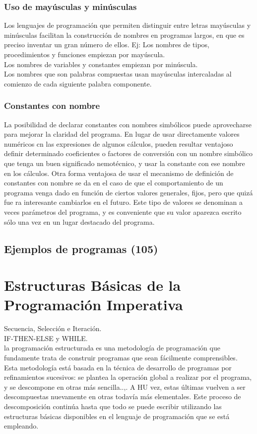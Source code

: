\documentclass[11pt,a4paper]{article}
\begin{document}
  \subsubsection{Uso de mayúsculas y minúsculas}
 Los lenguajes de programación que permiten distinguir entre letras mayúsculas 
 y minúsculas facilitan la construcción de nombres en programas largos, en que 
 es preciso inventar un gran número de ellos.
 Ej:
  Los nombres de tipos, procedimientos y funciones empiezan por mayúscula.\\
  Los nombres de variables y constantes empiezan por minúscula.\\
  Los nombres que son palabras compuestas usan mayúsculas intercaladas 
  al comienzo de cada siguiente palabra componente.\\
  \subsubsection{Constantes con nombre}
  La posibilidad de declarar constantes con nombres simbólicos puede aprovecharse para mejorar la claridad del programa. En lugar de usar directamente 
  valores numéricos cn las expresiones de algunos cálculos, pueden resultar ventajoso definir determinado coeficientes o factores de conversión con un nombre 
  simbólico que tenga un buen significado nemotécnico, y usar la constante con 
  ese nombre en los cálculos. Otra forma ventajosa de usar el mecanismo de definición de constantes con 
  nombre se da en el caso de que el comportamiento de un programa venga dado 
  en función de ciertos valores generales, fijos, pero que quizá fue ra interesante 
  cambiarlos en el futuro. Este tipo de valores se denominan a veces parámetros 
  del programa, y es conveniente que su valor aparezca escrito sólo una vez en 
  un lugar destacado del programa.
  \subsection{Ejemplos de programas (105)}
  \section{Estructuras Básicas de la Programación Imperativa}
  Secuencia, Selección e Iteración.\\
  IF-THEN-ELSE y WHILE.\\
  la programación estructurada es una metodología de programación que fundamente trata de construir programas que sean fácilmente comprensibles.\\
  Esta metodología está basada en la técnica de desarrollo de programas por refinamientos sucesivos: se plantea la operación global a realizar por el programa, y se descompone en 
  otras más sencilla..,. A HU vez, estas últimas vuelven a ser descompuestas nuevamente en otras todavía más elementales. Este proceso de descomposición 
  continúa hasta que todo se puede escribir utilizando las estructuras básicas 
  disponibles en el lenguaje de programación que se está empleando. 
\end{document}
